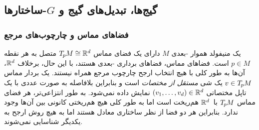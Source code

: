 

\subsection{گیج‌ها، تبدیل‌های گیج و \textit{$G$}-ساختارها}
\label{sec:21_main}


\subsubsection{فضاهای مماس و چارچوب‌های مرجع}
\label{sec:gauges_gauge_trafos}


یک منیفولد هموار -بعدی $M$ دارای یک فضای مماس $T_{\mkern-1.5mu p}\mkern-.5muM\cong\mathbb{R}^d$ متصل به هر نقطه $p\in M$ است. فضاهای مماس، فضاهای برداری -بعدی هستند، با این حال، برخلاف $\mathbb{R}^d$، آن‌ها به طور کلی با هیچ انتخاب ارجح چارچوب مرجع همراه نیستند. یک بردار مماس $v\in T_{\mkern-1.5mu p}\mkern-.5muM$ یک شی \emph{مستقل از مختصات} است و بنابراین بلافاصله به صورت عددی با یک تاپل مختصاتی $(v_1,\dots,v_d)\in\mathbb{R}^d$ نمایش داده نمی‌شود. به طور انتزاعی‌تر، هر فضای مماس $T_{\mkern-1.5mu p}\mkern-.5muM$ با~$\mathbb{R}^d$ هم‌ریخت است اما به طور کلی هیچ هم‌ریختی کانونی بین آن‌ها وجود ندارد. بنابراین هر دو فضا از نظر ساختاری معادل هستند اما به هیچ روش ارجح به یکدیگر شناسایی نمی‌شوند.


